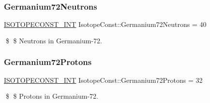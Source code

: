 \subsubsection{\texorpdfstring{Germanium72\+Neutrons}{Germanium72Neutrons}}
{\footnotesize\ttfamily \mbox{\hyperlink{group___isotope_const-_macros_ga5f18360b3e99483a35c32d789e62621c}{I\+S\+O\+T\+O\+P\+E\+C\+O\+N\+S\+T\+\_\+\+I\+NT}} Isotope\+Const\+::\+Germanium72\+Neutrons = 40}

\$ \$ Neutrons in Germanium-\/72. \mbox{\label{group___isotope_const-_germanium-_ge72_ga216fd327c3da197649bf978169bd65b9}} 
\subsubsection{\texorpdfstring{Germanium72\+Protons}{Germanium72Protons}}
{\footnotesize\ttfamily \mbox{\hyperlink{group___isotope_const-_macros_ga5f18360b3e99483a35c32d789e62621c}{I\+S\+O\+T\+O\+P\+E\+C\+O\+N\+S\+T\+\_\+\+I\+NT}} Isotope\+Const\+::\+Germanium72\+Protons = 32}

\$ \$ Protons in Germanium-\/72. 